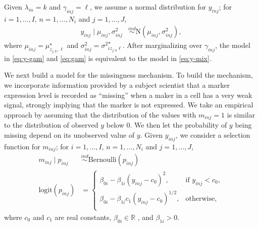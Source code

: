 \documentclass[12pt,]{article}
\newcommand{\p}[1]{\left(#1\right)}
\newcommand{\N}{ \mathcal{N} }
\newcommand{\ind}{\overset{ind}{\sim}}
\def\logit{\text{logit}}
\def\Bern{\text{Bernoulli}}
\def\N{\text{N}}
\def\Prob{\text{Pr}}
\begin{document}
Given \(\lambda_{in}=k\) and \(\gamma_{inj}=\ell\), we assume a normal
distribution for \(y_{inj}\); for \(i=1, \ldots, I\),
\(n=1, \ldots, N_i\) and \(j=1, \ldots, J\),
\begin{align}
  y_{inj} \mid \mu_{inj}, \sigma^2_{inj}  &\ind \N(\mu_{inj}, \sigma^2_{inj}), \label{eq:y-gam}
\end{align}
where \(\mu_{inj} = \mu^\star_{z_{j,k},\ell}\) and \(\sigma^2_{inj} =
{\sigma^{2}}^\star_{iz_{j,k}\ell}\). After marginalizing over $\gamma_{inj}$,
the model in \eqref{eq:y-gam} and \eqref{eq:gam} is equivalent to the model in
\eqref{eq:y-mix}.  

We next build a model for the missingness mechanism.
To build the mechanism, we incorporate information provided by a subject scientist that a marker expression level is
recorded as ``missing'' when a maker in a cell has a very weak signal, strongly implying that the marker is not expressed. %
We take an empirical approach by assuming that the distribution of the values with $m_{inj}=1$ is similar to the distribution of observed $y$ below 0. We then let the probability of $y$ being missing depend on its unobserved value of $y$.  %
%
Given
\(y_{inj}\), we consider a selection function for \(m_{inj}\); for
\(i=1, \ldots, I\), \(n=1, \ldots, N_i\) and \(j=1, \ldots, J\),
\begin{align}
  m_{inj} \mid p_{inj} &\ind \Bern(p_{inj}) \nonumber \\
  \logit(p_{inj}) &= \begin{cases}
  \beta_{0i} - \beta_{1i}(y_{inj}-c_0)^2, & \text{if } y_{inj} < c_0\nonumber, \\
  \beta_{0i} - \beta_{1i}c_1\p{y_{inj}-c_0}^{1/2}, & \text{otherwise}, \nonumber \\
  \end{cases} \label{eq:missing}
\end{align}
where \(c_0\) and \(c_1\) are real constants, $\beta_{0i} \in \mathbb{R}$ , and
$\beta_{1i} > 0$.
\end{document}
